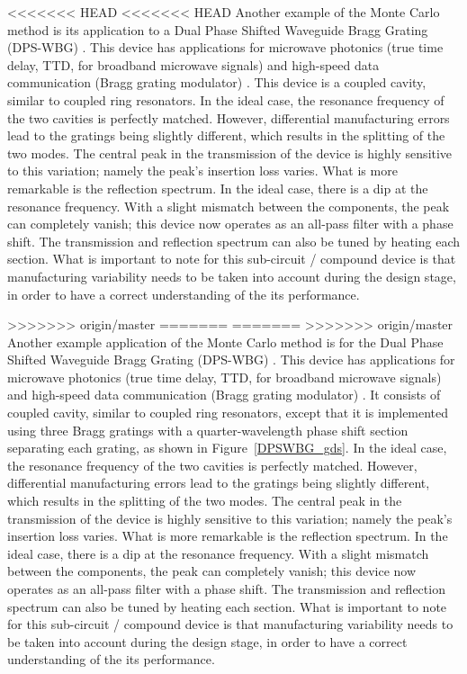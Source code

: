 \documentclass[journal]{spie}
\begin{document}
<<<<<<< HEAD
<<<<<<< HEAD
Another example of the Monte Carlo method is its application to a Dual Phase Shifted Waveguide Bragg Grating (DPS-WBG) \cite{burla2013integrated, bedard2016dual}.  This device has applications for microwave photonics (true time delay, TTD, for broadband microwave signals) \cite{burla2013integrated} and high-speed data communication (Bragg grating modulator) \cite{bedard2016dual}.  This device is a coupled cavity, similar to coupled ring resonators.  In the ideal case, the resonance frequency of the two cavities is perfectly matched.  However, differential manufacturing errors lead to the gratings being slightly different, which results in the splitting of the two modes.  The central peak in the transmission of the device is highly sensitive to this variation; namely the peak's insertion loss varies.  What is more remarkable is the reflection spectrum. In the ideal case, there is a dip at the resonance frequency.  With a slight mismatch between the components, the peak can completely vanish; this device now operates as an all-pass filter with a phase shift.  The transmission and reflection spectrum can also be tuned by heating each section.  What is important to note for this sub-circuit / compound device is that manufacturing variability needs to be taken into account during the design stage, in order to have a correct understanding of the its performance.

>>>>>>> origin/master
=======
=======
>>>>>>> origin/master
Another example application of the Monte Carlo method is for the Dual Phase Shifted Waveguide Bragg Grating (DPS-WBG) \cite{burla2013integrated, bedard2016dual}.  This device has applications for microwave photonics (true time delay, TTD, for broadband microwave signals) \cite{burla2013integrated} and high-speed data communication (Bragg grating modulator) \cite{bedard2016dual}.  It consists of  coupled cavity, similar to coupled ring resonators, except that it is implemented using three Bragg gratings with a quarter-wavelength phase shift section separating each grating, as shown in Figure~\ref{DPSWBG_gds}.  In the ideal case, the resonance frequency of the two cavities is perfectly matched.  However, differential manufacturing errors lead to the gratings being slightly different, which results in the splitting of the two modes.  The central peak in the transmission of the device is highly sensitive to this variation; namely the peak's insertion loss varies.  What is more remarkable is the reflection spectrum. In the ideal case, there is a dip at the resonance frequency.  With a slight mismatch between the components, the peak can completely vanish; this device now operates as an all-pass filter with a phase shift.  The transmission and reflection spectrum can also be tuned by heating each section.  What is important to note for this sub-circuit / compound device is that manufacturing variability needs to be taken into account during the design stage, in order to have a correct understanding of the its performance.
\end{document}
